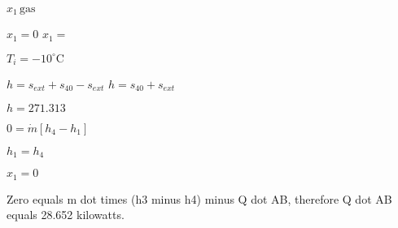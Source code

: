 \( x_1 \, \text{gas} \)  

\( x_1 = 0 \)  
\( x_1 = \)  

\( T_i = -10^\circ \text{C} \)  

\( h = s_{ext} + s_{40} - s_{ext} \)  
\( h = s_{40} + s_{ext} \)  

\( h = 271.313 \)  

\( 0 = \dot{m} [h_4 - h_1] \)  

\( h_1 = h_4 \)  

\( x_1 = 0 \)

Zero equals m dot times (h3 minus h4) minus Q dot AB, therefore Q dot AB equals 28.652 kilowatts.